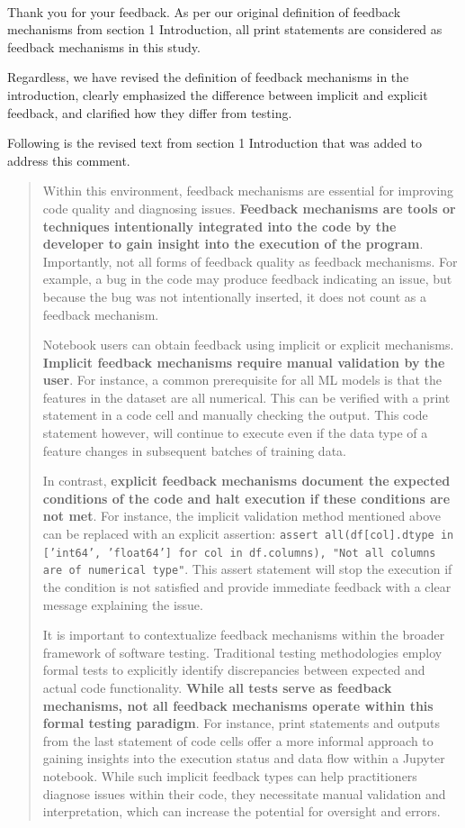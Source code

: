 \documentclass[11pt,fleqn]{article}
\newcommand{\eline}{\vspace*{.75\baselineskip}}
\newcommand{\Us}{\eline \noindent {\bf Response:}\\}
\begin{document}
\Us Thank you for your feedback. As per our original definition of feedback mechanisms from section 1 Introduction, all print statements are considered as feedback mechanisms in this study.

Regardless, we have revised the definition of feedback mechanisms in the introduction, clearly emphasized the difference between implicit and explicit feedback, and clarified how they differ from testing.

Following is the revised text from section 1 Introduction that was added to address this comment.

\begin{quote}
  Within this environment, feedback mechanisms are essential for improving code quality and diagnosing issues. \textbf{Feedback mechanisms are tools or techniques intentionally integrated into the code by the developer to gain insight into the execution of the program}. Importantly, not all forms of feedback quality as feedback mechanisms. For example, a bug in the code may produce feedback indicating an issue, but because the bug was not intentionally inserted, it does not count as a feedback mechanism.

  Notebook users can obtain feedback using implicit or explicit mechanisms. \textbf{Implicit feedback mechanisms require manual validation by the user}. For instance, a common prerequisite for all ML models is that the features in the dataset are all numerical. This can be verified with a print statement in a code cell and manually checking the output. This code statement however, will continue to execute even if the data type of a feature changes in subsequent batches of training data.

  In contrast, \textbf{explicit feedback mechanisms document the expected conditions of the code and halt execution if these conditions are not met}. For instance, the implicit validation method mentioned above can be replaced with an explicit assertion: \texttt{assert all(df[col].dtype in ['int64', 'float64'] for col in df.columns), "Not all columns are of numerical type"}. This assert statement will stop the execution if the condition is not satisfied and provide immediate feedback with a clear message explaining the issue.

  It is important to contextualize feedback mechanisms within the broader framework of software testing. Traditional testing methodologies employ formal tests to explicitly identify discrepancies between expected and actual code functionality. \textbf{While all tests serve as feedback mechanisms, not all feedback mechanisms operate within this formal testing paradigm}. For instance, print statements and outputs from the last statement of code cells offer a more informal approach to gaining insights into the execution status and data flow within a Jupyter notebook. While such implicit feedback types can help practitioners diagnose issues within their code, they necessitate manual validation and interpretation, which can increase the potential for oversight and errors.
\end{quote}
\end{document}
